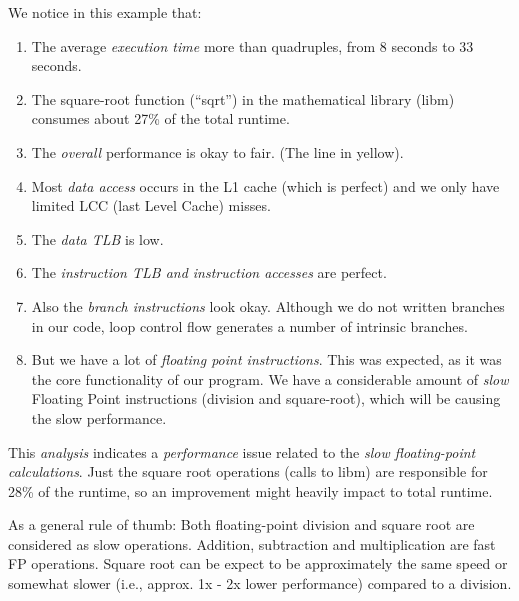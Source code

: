 We notice in this example that:
\begin{enumerate}
  \item  The average \emph{execution time} more than quadruples, from 8 seconds to 33 seconds.
  \item  The square-root function (``sqrt'') in the mathematical library (libm) consumes about 27\% of the total runtime.
  \item  The \emph{overall} performance is okay to fair. (The line in yellow).
  \item  Most \emph{data access} occurs in the L1 cache (which is perfect) and we only have limited LCC (last Level Cache) misses.
  \item  The \emph{data TLB} is low.
  \item  The \emph{instruction TLB and instruction accesses} are perfect.
  \item  Also the \emph{branch instructions} look okay. Although we do not written branches in our code, loop control flow generates a number of intrinsic branches.
  \item  But we have a lot of \emph{floating point instructions}. This was expected, as it was the core functionality of our program. We have a considerable amount of \emph{slow} Floating Point instructions (division and square-root), which will be causing the slow performance.
\end{enumerate}

This \emph{analysis} indicates a \emph{performance }issue related to the\emph{ slow floating-point calculations}. Just the square root operations (calls to libm) are responsible for 28\% of the runtime, so an improvement might heavily impact to total runtime.

As a general rule of thumb: Both floating-point division and square root are considered as slow operations. Addition, subtraction and multiplication are fast FP operations. Square root can be expect to be approximately the same speed or somewhat slower (i.e., approx. 1x - 2x lower performance) compared to a division.

